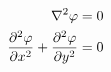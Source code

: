 \documentclass[report_template_main.tex]{subfiles}
\begin{document}
\begin{align*}
    \displaystyle %
    \nabla^2\varphi                         &= 0 \\
    \pd[2]{\varphi}{x} + \pd[2]{\varphi}{y} &= 0
\end{align*}
\end{document}
